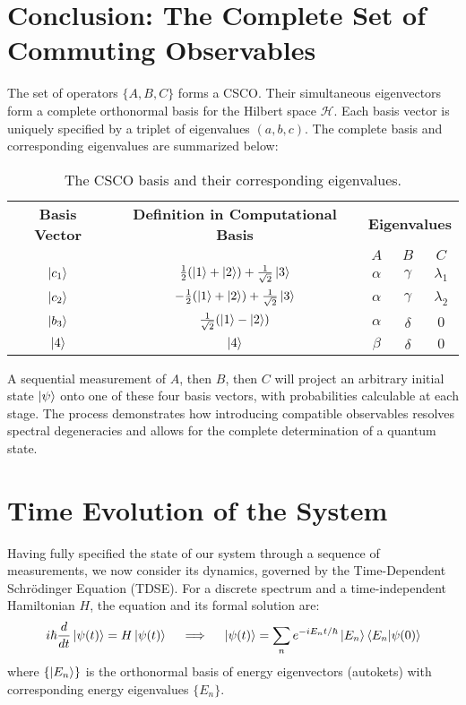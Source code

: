 \documentclass[11pt,a4paper]{article}
\begin{document}
\section{Conclusion: The Complete Set of Commuting Observables}
The set of operators $\{A, B, C\}$ forms a CSCO. Their simultaneous eigenvectors form a complete orthonormal basis for the Hilbert space $\mathcal{H}$. Each basis vector is uniquely specified by a triplet of eigenvalues $(a,b,c)$. The complete basis and corresponding eigenvalues are summarized below:

\begin{table}[h!]
\centering
\begin{tabular}{c|c|ccc}
\hline\hline
\textbf{Basis Vector} & \textbf{Definition in Computational Basis} & \multicolumn{3}{c}{\textbf{Eigenvalues}} \\
 & & $A$ & $B$ & $C$ \\
\hline
$\ket{c_1}$ & $\frac{1}{2}(\ket{1}+\ket{2}) + \frac{1}{\sqrt{2}}\ket{3}$ & $\alpha$ & $\gamma$ & $\lambda_1$ \\
$\ket{c_2}$ & $-\frac{1}{2}(\ket{1}+\ket{2}) + \frac{1}{\sqrt{2}}\ket{3}$ & $\alpha$ & $\gamma$ & $\lambda_2$ \\
$\ket{b_3}$ & $\frac{1}{\sqrt{2}}(\ket{1}-\ket{2})$ & $\alpha$ & $\delta$ & $0$ \\
$\ket{4}$ & $\ket{4}$ & $\beta$ & $\delta$ & $0$ \\
\hline\hline
\end{tabular}
\caption{The CSCO basis and their corresponding eigenvalues.}
\label{tab:csco_basis}
\end{table}

A sequential measurement of $A$, then $B$, then $C$ will project an arbitrary initial state $\ket{\psi}$ onto one of these four basis vectors, with probabilities calculable at each stage. The process demonstrates how introducing compatible observables resolves spectral degeneracies and allows for the complete determination of a quantum state.


\section{Time Evolution of the System}

Having fully specified the state of our system through a sequence of measurements, we now consider its dynamics, governed by the Time-Dependent Schrödinger Equation (TDSE). For a discrete spectrum and a time-independent Hamiltonian $H$, the equation and its formal solution are:
$$
i\hbar \frac{d}{dt}\ket{\psi(t)} = H \ket{\psi(t)} \quad \implies \quad \ket{\psi(t)} = \sum_n e^{-iE_n t/\hbar} \ket{E_n}\braket{E_n}{\psi(0)}
$$
where $\{\ket{E_n}\}$ is the orthonormal basis of energy eigenvectors (autokets) with corresponding energy eigenvalues $\{E_n\}$.
\end{document}
